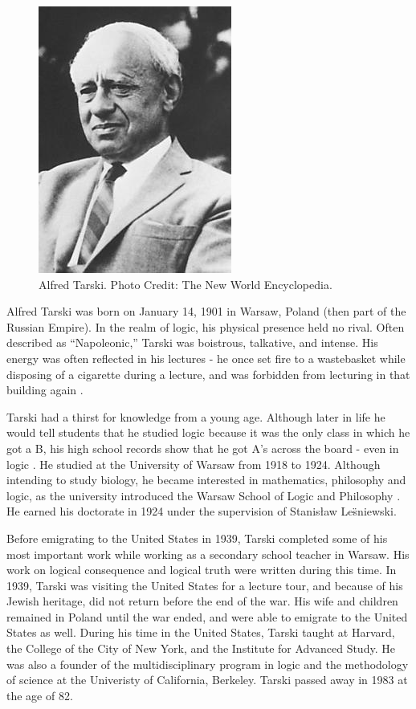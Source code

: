 \documentclass[../../../include/open-logic-section]{subfiles}
\begin{document}


\begin{figure}[h!] 
\centering
\includegraphics[scale=.75]{alfred-tarski.jpg} 
\caption{Alfred Tarski. Photo Credit: The New World Encyclopedia.}
 \end{figure}

Alfred Tarski was born on January 14, 1901 in Warsaw, Poland (then part of
the Russian Empire). In the realm of logic, his physical presence held no rival. 
Often
described as ``Napoleonic,'' Tarski was boistrous, talkative, and intense.
His energy was often reflected in his lectures - he once set fire to a
wastebasket while disposing of a cigarette during a lecture, and was
forbidden from lecturing in that building again \citep[2]{feferman2004}.

Tarski had a thirst for knowledge from a young age. Although later in life
he would tell students that he studied logic because it was the only class
in which he got a B, his high school records show that he got A's across
the board - even in logic \citep[18]{feferman2004}. He studied at the
University of Warsaw from 1918 to 1924. Although intending to study
biology, he became interested in mathematics, philosophy and logic, as the
university introduced the Warsaw School of Logic and Philosophy
\cite[30]{feferman2004}. He earned his doctorate in 1924 under the
supervision of Stanisław Le\"{s}niewski.

Before emigrating to the United States in 1939, Tarski completed some of
his most important work while working as a secondary school teacher in
Warsaw. His work on logical consequence and logical truth were written
during this time. In 1939, Tarski was visiting the United States for a
lecture tour, and because of his Jewish heritage, did not return before the
end of the war. His wife and children remained in Poland until the war
ended, and were able to emigrate to the United States as well. During his
time in the United States, Tarski taught at Harvard, the College of the
City of New York, and the Institute for Advanced Study. He was also a
founder of the multidisciplinary program in logic and the methodology of
science at the Univeristy of California, Berkeley. Tarski passed away in
1983 at the age of 82.
\end{document}
